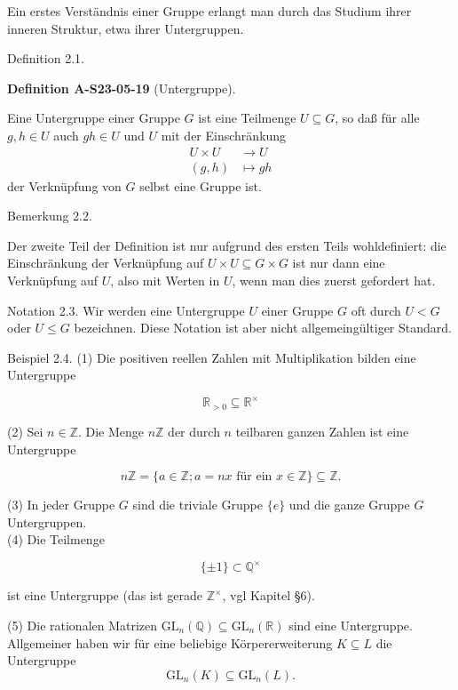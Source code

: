 \documentclass[10pt, letterpaper]{article}
\newcommand{\CustomHeading}[3]{%
  \par\medskip\noindent%
  \textbf{#1 #2} \textnormal{(#3)}.\enskip%
}
\newenvironment{DEF}[2]{\begin{unitbox}\CustomHeading{Definition}{#1}{#2}}{\end{unitbox}}
\begin{document}
Ein erstes Verständnis einer Gruppe erlangt man durch das Studium ihrer inneren Struktur, etwa ihrer Untergruppen.



Definition 2.1. 


\begin{DEF}{A-S23-05-19}{Untergruppe}
Eine Untergruppe einer Gruppe $G$ ist eine Teilmenge $U \subseteq G$, so daß für alle $g, h \in U$ auch $g h \in U$ und $U$ mit der Einschränkung
$$
\begin{aligned}
U \times U & \rightarrow U \\
(g, h) & \mapsto g h
\end{aligned}
$$
der Verknüpfung von $G$ selbst eine Gruppe ist.
\end{DEF}


Bemerkung 2.2. 

Der zweite Teil der Definition ist nur aufgrund des ersten Teils wohldefiniert: die Einschränkung der Verknüpfung auf $U \times U \subseteq G \times G$ ist nur dann eine Verknüpfung auf $U$, also mit Werten in $U$, wenn man dies zuerst gefordert hat.

Notation 2.3. Wir werden eine Untergruppe $U$ einer Gruppe $G$ oft durch $U<G$ oder $U \leq G$ bezeichnen. Diese Notation ist aber nicht allgemeingültiger Standard.

Beispiel 2.4. (1) Die positiven reellen Zahlen mit Multiplikation bilden eine Untergruppe

$$
\mathbb{R}_{>0} \subseteq \mathbb{R}^{\times}
$$

(2) Sei $n \in \mathbb{Z}$. Die Menge $n \mathbb{Z}$ der durch $n$ teilbaren ganzen Zahlen ist eine Untergruppe

$$
n \mathbb{Z}=\{a \in \mathbb{Z} ; a=n x \text { für ein } x \in \mathbb{Z}\} \subseteq \mathbb{Z} .
$$

(3) In jeder Gruppe $G$ sind die triviale Gruppe $\{e\}$ und die ganze Gruppe $G$ Untergruppen.\\
(4) Die Teilmenge

$$
\{ \pm 1\} \subset \mathbb{Q}^{\times}
$$

ist eine Untergruppe (das ist gerade $\mathbb{Z}^{\times}$, vgl Kapitel §6).


(5) Die rationalen Matrizen $\mathrm{GL}_{n}(\mathbb{Q}) \subseteq \mathrm{GL}_{n}(\mathbb{R})$ sind eine Untergruppe. Allgemeiner haben wir für eine beliebige Körpererweiterung $K \subseteq L$ die Untergruppe
$$
\mathrm{GL}_{n}(K) \subseteq \mathrm{GL}_{n}(L) .
$$
\end{document}
